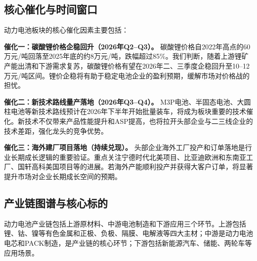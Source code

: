 \subsection{核心催化与时间窗口}

动力电池板块的核心催化因素主要包括：

\textbf{催化一：碳酸锂价格企稳回升（2026年Q2--Q3）。} 碳酸锂价格自2022年高点的60万元/吨回落至2025年底的约8万元/吨，跌幅超过85\%。我们判断，随着上游锂矿产能出清和下游需求复苏，碳酸锂价格有望在2026年二、三季度企稳回升至10--12万元/吨区间。锂价企稳将有助于稳定电池企业的盈利预期，缓解市场对价格战的担忧。

\textbf{催化二：新技术路线量产落地（2026年Q3--Q4）。} M3P电池、半固态电池、大圆柱电池等新技术路线预计在2026年下半年开始批量装车，将成为板块重要的技术催化。新技术不仅带来产品性能提升和ASP提高，也将拉开头部企业与二三线企业的技术差距，强化龙头的竞争优势。

\textbf{催化三：海外建厂项目落地（持续兑现）。} 头部企业海外工厂投产和订单落地是行业长期成长逻辑的重要验证。重点关注宁德时代北美项目、比亚迪欧洲和东南亚工厂、国轩高科美国项目等的进展。若海外产能顺利投产并获得大客户订单，将显著提升市场对企业长期成长空间的预期。

\subsection{产业链图谱与核心标的}

动力电池产业链包括上游原材料、中游电池制造和下游应用三个环节。上游包括锂、钴、镍等有色金属和正极、负极、隔膜、电解液等四大主材；中游是动力电池电芯和PACK制造，是产业链的核心环节；下游包括新能源汽车、储能、两轮车等应用场景。

